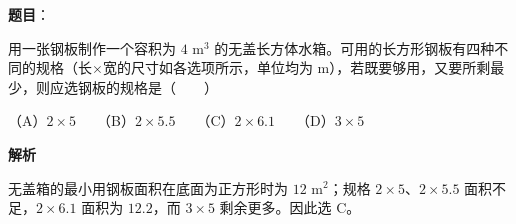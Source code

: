\begin{answer}

\textbf{题目}：

用一张钢板制作一个容积为 $4\text{ m}^3$ 的无盖长方体水箱。可用的长方形钢板有四种不同的规格（长$\times$宽的尺寸如各选项所示，单位均为 m），若既要够用，又要所剩最少，则应选钢板的规格是\mbox{（　　）}

（A）$2\times5$　　（B）$2\times5.5$　　（C）$2\times6.1$　　（D）$3\times5$

\textbf{解析}

无盖箱的最小用钢板面积在底面为正方形时为 $12\text{ m}^2$；规格 $2\times5$、$2\times5.5$ 面积不足，$2\times6.1$ 面积为 $12.2$，而 $3\times5$ 剩余更多。因此选 C。


\end{answer}

